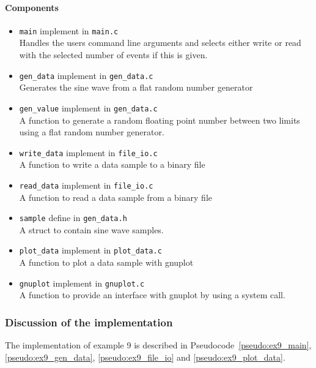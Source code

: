 \documentclass[11pt]{scrartcl}
\def\psc{Pseudocode}
\begin{document}
\paragraph{Components}
\begin{itemize}
\item \texttt{main} implement in \texttt{main.c}\\
Handles the users command line arguments and selects either write or
read with the selected number of events if this is given.\\
%
\item \texttt{gen\_data} implement in \texttt{gen\_data.c}\\
Generates the sine wave from a flat random number generator\\
%
\item \texttt{gen\_value} implement in \texttt{gen\_data.c}\\
A function to generate a random floating point number between two 
limits using a flat random number generator.\\
%
\item \texttt{write\_data} implement in \texttt{file\_io.c}\\
A function to write a data sample to a binary file \\
%
\item \texttt{read\_data} implement in \texttt{file\_io.c}\\
A function to read a data sample from a binary file\\
%
\item \texttt{sample} define in \texttt{gen\_data.h} \\
A struct to contain sine wave samples.\\
%
\item \texttt{plot\_data} implement in \texttt{plot\_data.c} \\
A function to plot a data sample with gnuplot \\
%
\item \texttt{gnuplot} implement in \texttt{gnuplot.c} \\
A function to provide an interface with gnuplot by using a system
call. \\
\end{itemize}

\subsubsection*{Discussion of the implementation}
The implementation of example 9 is described in
\psc~\ref{pseudo:ex9_main}, \ref{pseudo:ex9_gen_data},
\ref{pseudo:ex9_file_io} and \ref{pseudo:ex9_plot_data}.
\end{document}
